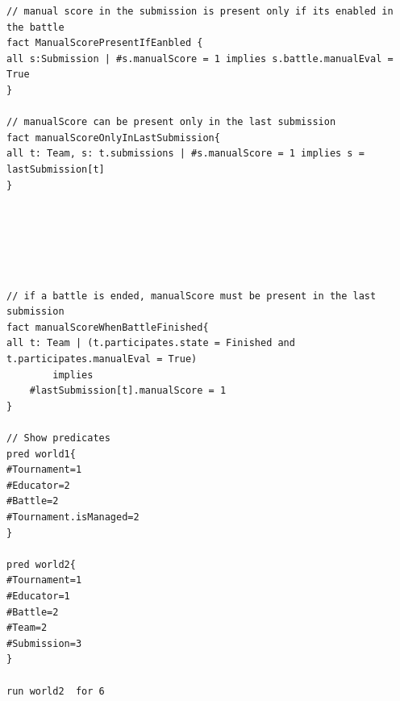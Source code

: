 \begin{lstlisting}[language=alloy]
// manual score in the submission is present only if its enabled in the battle
fact ManualScorePresentIfEanbled {
all s:Submission | #s.manualScore = 1 implies s.battle.manualEval = True 
}

// manualScore can be present only in the last submission
fact manualScoreOnlyInLastSubmission{
all t: Team, s: t.submissions | #s.manualScore = 1 implies s = lastSubmission[t]
}






// if a battle is ended, manualScore must be present in the last submission
fact manualScoreWhenBattleFinished{
all t: Team | (t.participates.state = Finished and t.participates.manualEval = True) 
        implies 
    #lastSubmission[t].manualScore = 1
}

// Show predicates
pred world1{
#Tournament=1
#Educator=2
#Battle=2
#Tournament.isManaged=2
}

pred world2{
#Tournament=1
#Educator=1
#Battle=2
#Team=2
#Submission=3
}

run world2  for 6
\end{lstlisting}

